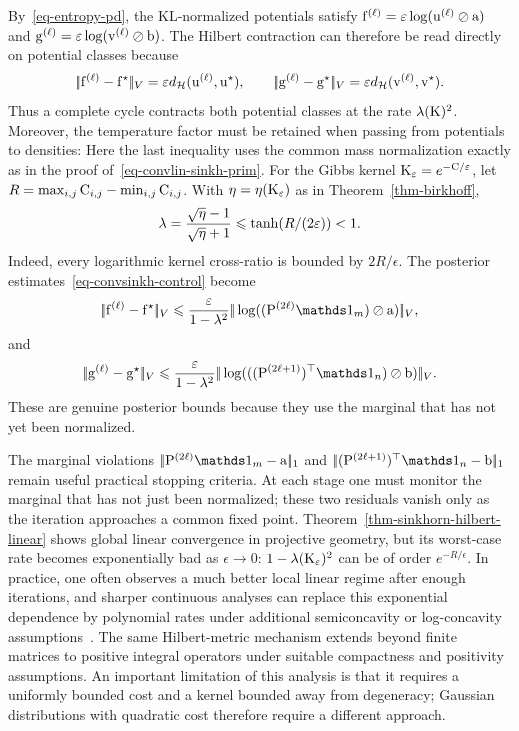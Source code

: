 By~\eqref{eq-entropy-pd}, the KL-normalized potentials satisfy
\(
	\mathrm{f}^{(\ell)}=\varepsilon\log(\mathrm{u}^{(\ell)}\oslash\mathrm{a})
\)
and
\(
	\mathrm{g}^{(\ell)}=\varepsilon\log(\mathrm{v}^{(\ell)}\oslash\mathrm{b})
\).
The Hilbert contraction can therefore be read directly on potential classes because
\[
	|\!| \mathrm{f}^{(\ell)}-\mathrm{f}^\star |\!|_V
	=
	\varepsilon d_{\mathcal{H}}(\mathrm{u}^{(\ell)},\mathrm{u}^\star),
	\qquad
	|\!| \mathrm{g}^{(\ell)}-\mathrm{g}^\star |\!|_V
	=
	\varepsilon d_{\mathcal{H}}(\mathrm{v}^{(\ell)},\mathrm{v}^\star).
\]
Thus a complete cycle contracts both potential classes at the rate $\lambda(\mathrm{K})^2$. Moreover, the temperature factor must be retained when passing from potentials to densities:
Here the last inequality uses the common mass normalization exactly as in the proof of~\eqref{eq-convlin-sinkh-prim}. For the Gibbs kernel $\mathrm{K}_\varepsilon=e^{-\mathrm{C}/\varepsilon}$, let $R=\max_{i,j}\mathrm{C}_{i,j}-\min_{i,j}\mathrm{C}_{i,j}$. With $\eta=\eta(\mathrm{K}_\varepsilon)$ as in Theorem~\ref{thm-birkhoff},
\[
	\lambda=\frac{\sqrt{\eta}-1}{\sqrt{\eta}+1}
	\leqslant
	\tanh(R/(2\varepsilon))<1.
\]
Indeed, every logarithmic kernel cross-ratio is bounded by $2R/\epsilon$. The posterior estimates~\eqref{eq-convsinkh-control} become
\[
	\norm{\fD^{(\ell)}-\fD^\star}_V
	\leq
	\frac{\epsilon}{1-\la^2}
		\norm{\log((\P^{(2\ell)}\ones_m)\oslash\a)}_V,
\]
and
\[
	\norm{\gD^{(\ell)}-\gD^\star}_V
	\leq
	\frac{\epsilon}{1-\la^2}
		\norm{\log(((\P^{(2\ell+1)})^\top\ones_n)\oslash\b)}_V.
\]
These are genuine posterior bounds because they use the marginal that has not yet been normalized.



The marginal violations $\norm{\P^{(2\ell)}\ones_m-\a}_1$ and $\norm{(\P^{(2\ell+1)})^\top\ones_n-\b}_1$ remain useful practical stopping criteria. At each stage one must monitor the marginal that has not just been normalized; these two residuals vanish only as the iteration approaches a common fixed point.
Theorem~\ref{thm-sinkhorn-hilbert-linear} shows global linear convergence in projective geometry, but its worst-case rate becomes exponentially bad as $\epsilon\rightarrow0$: $1-\lambda(\mathrm{K}_\varepsilon)^2$ can be of order $e^{-R/\epsilon}$. In practice, one often observes a much better local linear regime after enough iterations, and sharper continuous analyses can replace this exponential dependence by polynomial rates under additional semiconcavity or log-concavity assumptions~\cite{chizat2024sharper}.
%
The same Hilbert-metric mechanism extends beyond finite matrices to positive integral operators under suitable compactness and positivity assumptions.
%
An important limitation of this analysis is that it requires a uniformly bounded cost and a kernel bounded away from degeneracy; Gaussian distributions with quadratic cost therefore require a different approach.

